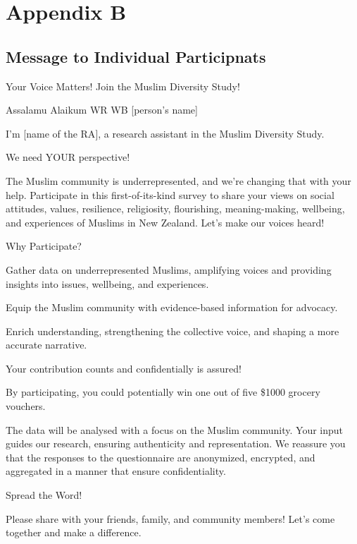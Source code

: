 \documentclass[
]{interact}
\begin{document}
\newpage{}

\section{Appendix B}\label{appendix-b}

\subsection{Message to Individual
Participnats}\label{message-to-individual-participnats}

Your Voice Matters! Join the Muslim Diversity Study!

\noindent Assalamu Alaikum WR WB {[}person's name{]}

\noindent I'm {[}name of the RA{]}, a research assistant in the Muslim
Diversity Study.

\noindent We need YOUR perspective!

\noindent The Muslim community is underrepresented, and we're changing
that with your help. Participate in this first-of-its-kind survey to
share your views on social attitudes, values, resilience, religiosity,
flourishing, meaning-making, wellbeing, and experiences of Muslims in
New Zealand. Let's make our voices heard!

\noindent Why Participate?

\noindent Gather data on underrepresented Muslims, amplifying voices and
providing insights into issues, wellbeing, and experiences.

\noindent Equip the Muslim community with evidence-based information for
advocacy.

\noindent Enrich understanding, strengthening the collective voice, and
shaping a more accurate narrative.

\noindent Your contribution counts and confidentially is assured!

\noindent By participating, you could potentially win one out of five
\$1000 grocery vouchers.

\noindent The data will be analysed with a focus on the Muslim
community. Your input guides our research, ensuring authenticity and
representation. We reassure you that the responses to the questionnaire
are anonymized, encrypted, and aggregated in a manner that ensure
confidentiality.

\noindent Spread the Word!

\noindent Please share with your friends, family, and community members!
Let's come together and make a difference.
\end{document}
